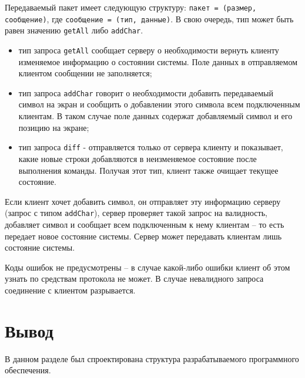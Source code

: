 Передаваемый пакет имеет следующую структуру: \texttt{пакет = (размер, сообщение)}, где \texttt{сообщение = (тип, данные)}. В свою очередь, тип может быть равен значению \texttt{getAll} либо \texttt{addChar}. 

\begin{itemize}
	\item тип запроса \texttt{getAll} сообщает серверу о необходимости вернуть клиенту изменяемое информацию о состоянии системы. Поле данных в отправляемом клиентом сообщении не заполняется;
	\item тип запроса \texttt{addChar} говорит о необходимости добавить передаваемый символ на экран и сообщить о добавлении этого символа всем подключенным клиентам. В таком случае поле данных содержат добавляемый символ и его позицию на экране;
	\item тип запроса \texttt{diff} - отправляется только от сервера клиенту и показывает, какие новые строки добавляются в неизменяемое состояние после выполнения команды. Получая этот тип, клиент также очищает текущее состояние.
\end{itemize}

Если клиент хочет добавить символ, он отправляет эту информацию серверу (запрос с типом \texttt{addChar}), сервер проверяет такой запрос на валидность, добавляет символ и сообщает всем подключенным к нему клиентам -- то есть передает новое состояние системы. Сервер может передавать клиентам лишь состояние системы.

Коды ошибок не предусмотрены -- в случае какой-либо ошибки клиент об этом узнать по средствам протокола не может. В случае невалидного запроса соединение с клиентом разрывается.

\section*{Вывод}

В данном разделе был спроектирована структура разрабатываемого программного обеспечения.

